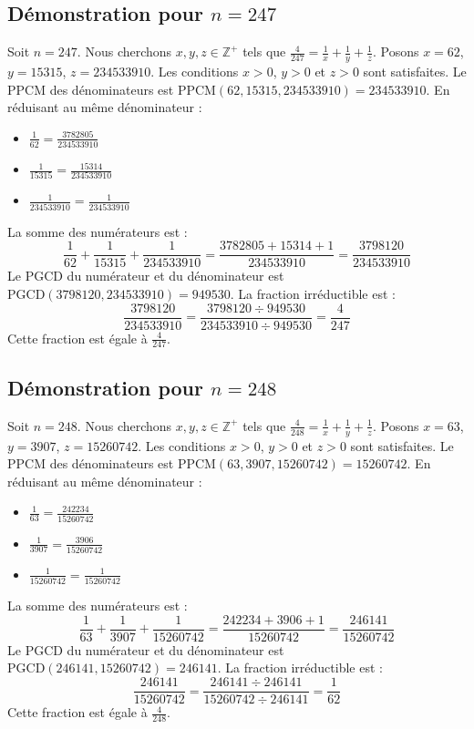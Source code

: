 \documentclass[11pt,a4paper]{article}
\begin{document}
\subsection{Démonstration pour $n = 247$}
Soit $n = 247$. Nous cherchons $x, y, z \in \mathbb{Z}^{+}$ tels que $\frac{4}{247} = \frac{1}{x} + \frac{1}{y} + \frac{1}{z}$.
Posons $x = 62$, $y = 15315$, $z = 234533910$.
Les conditions $x > 0$, $y > 0$ et $z > 0$ sont satisfaites.
Le PPCM des dénominateurs est $\text{PPCM}(62, 15315, 234533910) = 234533910$.
En réduisant au même dénominateur :
\begin{itemize}
    \item $\frac{1}{62} = \frac{3782805}{234533910}$
    \item $\frac{1}{15315} = \frac{15314}{234533910}$
    \item $\frac{1}{234533910} = \frac{1}{234533910}$
\end{itemize}
La somme des numérateurs est :
$$ \frac{1}{62} + \frac{1}{15315} + \frac{1}{234533910} = \frac{3782805 + 15314 + 1}{234533910} = \frac{3798120}{234533910} $$
Le PGCD du numérateur et du dénominateur est $\text{PGCD}(3798120, 234533910) = 949530$.
La fraction irréductible est :
$$ \frac{3798120}{234533910} = \frac{3798120 \div 949530}{234533910 \div 949530} = \frac{4}{247} $$
Cette fraction est égale à $\frac{4}{247}$.

\subsection{Démonstration pour $n = 248$}
Soit $n = 248$. Nous cherchons $x, y, z \in \mathbb{Z}^{+}$ tels que $\frac{4}{248} = \frac{1}{x} + \frac{1}{y} + \frac{1}{z}$.
Posons $x = 63$, $y = 3907$, $z = 15260742$.
Les conditions $x > 0$, $y > 0$ et $z > 0$ sont satisfaites.
Le PPCM des dénominateurs est $\text{PPCM}(63, 3907, 15260742) = 15260742$.
En réduisant au même dénominateur :
\begin{itemize}
    \item $\frac{1}{63} = \frac{242234}{15260742}$
    \item $\frac{1}{3907} = \frac{3906}{15260742}$
    \item $\frac{1}{15260742} = \frac{1}{15260742}$
\end{itemize}
La somme des numérateurs est :
$$ \frac{1}{63} + \frac{1}{3907} + \frac{1}{15260742} = \frac{242234 + 3906 + 1}{15260742} = \frac{246141}{15260742} $$
Le PGCD du numérateur et du dénominateur est $\text{PGCD}(246141, 15260742) = 246141$.
La fraction irréductible est :
$$ \frac{246141}{15260742} = \frac{246141 \div 246141}{15260742 \div 246141} = \frac{1}{62} $$
Cette fraction est égale à $\frac{4}{248}$.
\end{document}
